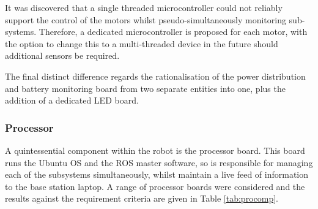 It was discovered that a single threaded microcontroller could not reliably support the control of the motors whilst pseudo-simultaneously monitoring sub-systems. Therefore, a dedicated microcontroller is proposed for each motor, with the option to change this to a multi-threaded device in the future should additional sensors be required.\par

The final distinct difference regards the rationalisation of the power distribution and battery monitoring board from two separate entities into one, plus the addition of a dedicated LED board.\par

\subsubsection{Processor}
A quintessential component within the robot is the processor board. This board runs the Ubuntu OS and the ROS master software, so is responsible for managing each of the subsystems simultaneously, whilst maintain a live feed of information to the base station laptop. A range of processor boards were considered and the results against the requirement criteria are given in Table \ref{tab:procomp}.\par

\begin{table}[ht]
\caption{Processor Comparison}
\label{tab:procomp}
\end{table}

